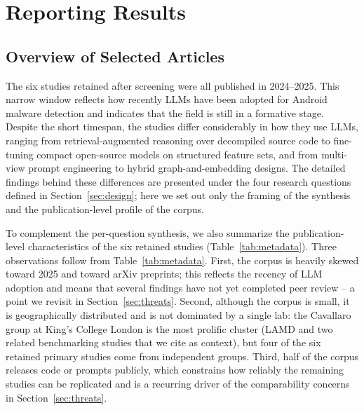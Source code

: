 \section{Reporting Results}\label{sec:report}

\subsection{Overview of Selected Articles}

The six studies retained after screening were all published in 2024--2025. This narrow window reflects how recently LLMs have been adopted for Android malware detection and indicates that the field is still in a formative stage. Despite the short timespan, the studies differ considerably in how they use LLMs, ranging from retrieval-augmented reasoning over decompiled source code to fine-tuning compact open-source models on structured feature sets, and from multi-view prompt engineering to hybrid graph-and-embedding designs. The detailed findings behind these differences are presented under the four research questions defined in Section~\ref{sec:design}; here we set out only the framing of the synthesis and the publication-level profile of the corpus.

To complement the per-question synthesis, we also summarize the publication-level characteristics of the six retained studies (Table~\ref{tab:metadata}).\label{sec:metadata} Three observations follow from Table~\ref{tab:metadata}. First, the corpus is heavily skewed toward 2025 and toward arXiv preprints; this reflects the recency of LLM adoption and means that several findings have not yet completed peer review -- a point we revisit in Section~\ref{sec:threats}. Second, although the corpus is small, it is geographically distributed and is not dominated by a single lab: the Cavallaro group at King's College London is the most prolific cluster (LAMD and two related benchmarking studies that we cite as context), but four of the six retained primary studies come from independent groups. Third, half of the corpus releases code or prompts publicly, which constrains how reliably the remaining studies can be replicated and is a recurring driver of the comparability concerns in Section~\ref{sec:threats}.

